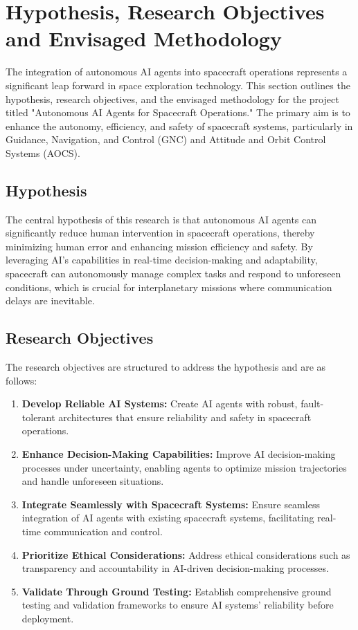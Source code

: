 \documentclass[a4paper,12pt]{article}
\begin{document}
\section{Hypothesis, Research Objectives and Envisaged Methodology}

The integration of autonomous AI agents into spacecraft operations represents a significant leap forward in space exploration technology. This section outlines the hypothesis, research objectives, and the envisaged methodology for the project titled "Autonomous AI Agents for Spacecraft Operations." The primary aim is to enhance the autonomy, efficiency, and safety of spacecraft systems, particularly in Guidance, Navigation, and Control (GNC) and Attitude and Orbit Control Systems (AOCS).

\subsection{Hypothesis}

The central hypothesis of this research is that autonomous AI agents can significantly reduce human intervention in spacecraft operations, thereby minimizing human error and enhancing mission efficiency and safety. By leveraging AI's capabilities in real-time decision-making and adaptability, spacecraft can autonomously manage complex tasks and respond to unforeseen conditions, which is crucial for interplanetary missions where communication delays are inevitable.

\subsection{Research Objectives}

The research objectives are structured to address the hypothesis and are as follows:

\begin{enumerate}
    \item \textbf{Develop Reliable AI Systems:} Create AI agents with robust, fault-tolerant architectures that ensure reliability and safety in spacecraft operations.
    \item \textbf{Enhance Decision-Making Capabilities:} Improve AI decision-making processes under uncertainty, enabling agents to optimize mission trajectories and handle unforeseen situations.
    \item \textbf{Integrate Seamlessly with Spacecraft Systems:} Ensure seamless integration of AI agents with existing spacecraft systems, facilitating real-time communication and control.
    \item \textbf{Prioritize Ethical Considerations:} Address ethical considerations such as transparency and accountability in AI-driven decision-making processes.
    \item \textbf{Validate Through Ground Testing:} Establish comprehensive ground testing and validation frameworks to ensure AI systems' reliability before deployment.
\end{enumerate}
\end{document}
